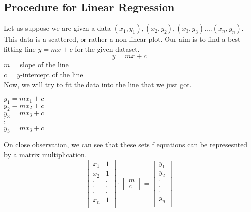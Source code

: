 \documentclass[12pt]{article}
\begin{document}
    \subsection{Procedure for Linear Regression}
        Let us suppose we are given a data $(x_1,y_1),(x_2,y_2),(x_3,y_3) .... (x_n,y_n)$.
        This data is a scattered, or rather a non linear plot. Our aim is to find a best fitting line $y=mx+c$ for the given dataset.
        \begin{equation}
            y=mx+c
        \end{equation}
        $m$ = slope of the line\\
        $c$ = $y$-intercept of the line\\
        Now, we will try to fit the data into the line that we just got.\\
        \begin{center}
            $y_1=mx_1+c$\\    
            $y_2=mx_2+c$\\
            $y_3=mx_3+c$\\
            $\cdot$\\
            $\cdot$\\
            $\cdot$\\
            $y_3=mx_3+c$\\
        \end{center}
        On close observation, we can see that these sets f equations can be represesnted by a matrix multiplication.
        \begin{equation}
            \begin{bmatrix}
                x_1  &  1\\
                x_2  &  1\\
                \cdot  &  \cdot\\
                \cdot  &  \cdot\\
                \cdot  &  \cdot\\
                x_n  &  1\\
            \end{bmatrix}
            \cdot
            \begin{bmatrix}
                m\\
                c
            \end{bmatrix}
            =
            \begin{bmatrix}
                y_1\\
                y_2\\
                \cdot\\
                \cdot\\
                \cdot\\
                y_n\\
            \end{bmatrix}
            \label{equ:multiplication}
        \end{equation}
\end{document}
